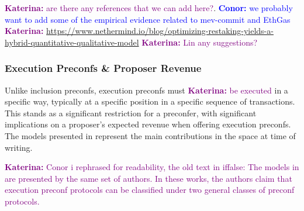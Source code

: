 \documentclass[a4paper]{article}
\theoremstyle{boldstyle}
\newcommand{\cm}[1]{\textcolor{blue}{\textbf{Conor:} #1}}
\newcommand{\ks}[1]{\textcolor{purple}{\textbf{Katerina:} #1}}
\begin{document}
     \ks{are there any references that we can add here?}. 
     \cm{we probably want to add some of the empirical evidence related to mev-commit and EthGas}
     \ks{\url{https://www.nethermind.io/blog/optimizing-restaking-yields-a-hybrid-quantitative-qualitative-model}} \ks{Lin any suggestions?}
    
    
    \subsubsection{Execution Preconfs \& Proposer Revenue}\label{sec:execpreconfproposerrevenue}
    Unlike inclusion preconfs, execution preconfs must \ks{ be executed} in a specific way, typically at a specific position in a specific sequence of transactions. This stands as a significant restriction for a preconfer, with significant implications on a proposer's expected revenue when offering execution preconfs. The models presented in \cite{W:EstimatingtheRevenuefromIndependentSub-SlotAuctionPreconfirmations, W:AnalysingExpectedProposerRevenuefromPreconfirmations, W:PreconfirmationsundertheNOlens} represent the main contributions in the space at time of writing. 
    
    \ks{Conor i rephrased for readability, the old text in iffalse: The models in \cite{W:EstimatingtheRevenuefromIndependentSub-SlotAuctionPreconfirmations, W:AnalysingExpectedProposerRevenuefromPreconfirmations} are presented by the same set of authors. In these works, the authors claim that execution preconf protocols can be classified under two general classes of preconf protocols.  }
    
\end{document}
